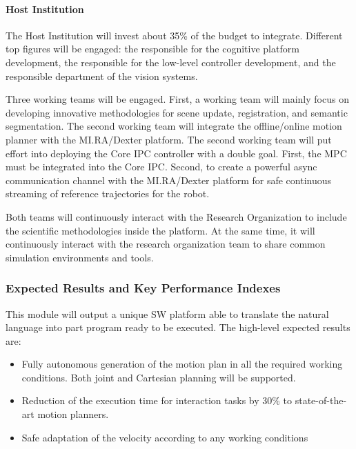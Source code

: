 \paragraph{Host Institution}\label{host-institution-1}

The Host Institution will invest about 35\% of the budget to integrate.
Different top figures will be engaged: the responsible for the cognitive
platform development, the responsible for the low-level controller
development, and the responsible department of the vision systems.

Three working teams will be engaged. First, a working team will mainly
focus on developing innovative methodologies for scene update,
registration, and semantic segmentation. The second working team will
integrate the offline/online motion planner with the MI.RA/Dexter
platform. The second working team will put effort into deploying the
Core IPC controller with a double goal. First, the MPC must be
integrated into the Core IPC. Second, to create a powerful async
communication channel with the MI.RA/Dexter platform for safe continuous
streaming of reference trajectories for the robot.

Both teams will continuously interact with the Research Organization to
include the scientific methodologies inside the platform. At the same
time, it will continuously interact with the research organization team
to share common simulation environments and tools.

\subsubsection{\texorpdfstring{Expected Results and Key Performance
Indexes
}{Expected Results and Key Performance Indexes }}\label{expected-results-and-key-performance-indexes-1}

This module will output a unique SW platform able to translate the
natural language into part program ready to be executed. The high-level
expected results are:

\begin{itemize}[arrow]
\item
  Fully autonomous generation of the motion plan in all the required
  working conditions. Both joint and Cartesian planning will be
  supported.
\item
  Reduction of the execution time for interaction tasks by 30\% to
  state-of-the-art motion planners.
\item
  Safe adaptation of the velocity according to any working conditions
\end{itemize}

